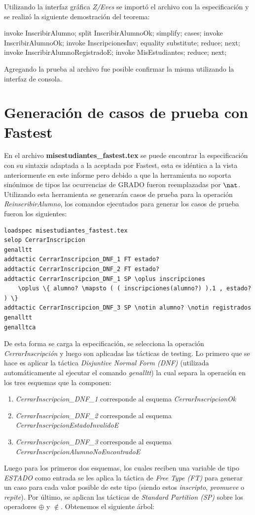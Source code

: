\documentclass{article}
\begin{document}
Utilizando la interfaz gráfica \emph{Z/Eves} se importó el archivo con la especificación y se realizó la siguiente demostración del teorema:
\begin{zproof}[InscribirAlumnoPI]
  invoke InscribirAlumno;
  split InscribirAlumnoOk;
  simplify;
  cases;
  invoke InscribirAlumnoOk;
  invoke InscripcionesInv;
  equality substitute;
  reduce;
  next;
  invoke InscribirAlumnoRegistradoE;
  invoke \Xi MisEstudiantes;
  reduce;
  next;
\end{zproof}

Agregando la prueba al archivo fue posible confirmar la misma utilizando la interfaz de consola.

\section{Generación de casos de prueba con Fastest}
En el archivo \textbf{misestudiantes\_fastest.tex} se puede encontrar la especificación con su sintaxis adaptada a la aceptada por Fastest, esta es idéntica a la vista anteriormente en este informe pero debido a que la herramienta no soporta sinónimos de tipos las ocurrencias de GRADO fueron reemplazadas por $\nat$.
Utilizando esta herramienta se generarán casos de prueba para la operación \emph{ReinscribirAlumno}, los comandos ejecutados para generar los casos de prueba fueron los siguientes:

\begin{verbatim}
loadspec misestudiantes_fastest.tex
selop CerrarInscripcion
genalltt
addtactic CerrarInscripcion_DNF_1 FT estado?
addtactic CerrarInscripcion_DNF_2 FT estado?
addtactic CerrarInscripcion_DNF_1 SP \oplus inscripciones 
    \oplus \{ alumno? \mapsto ( ( inscripciones(alumno?) ).1 , estado? ) \}
addtactic CerrarInscripcion_DNF_3 SP \notin alumno? \notin registrados
genalltt
genalltca
\end{verbatim}

De esta forma se carga la especificación, se selecciona la operación \emph{CerrarInscripción} y luego son aplicadas las tácticas de testing.
Lo primero que se hace es aplicar la táctica \emph{Disjuntive Normal Form (DNF)} (utilizada automáticamente al ejecutar el comando \emph{genalltt}) la cual separa la operación en los tres esquemas que la componen:
\begin{enumerate}
 \item \emph{CerrarInscripcion\_DNF\_1} corresponde al esquema \emph{CerrarInscripcionOk}
 \item \emph{CerrarInscripcion\_DNF\_2} corresponde al esquema \emph{CerrarInscripcionEstadoInvalidoE}
 \item \emph{CerrarInscripcion\_DNF\_3} corresponde al esquema \emph{CerrarInscripcionAlumnoNoEncontradoE}
\end{enumerate}
Luego para los primeros dos esquemas, los cuales reciben una variable de tipo \emph{ESTADO} como entrada se les aplica la táctica de \emph{Free Type (FT)} para generar un caso para cada valor posible de este tipo (siendo estos \emph{inscripto}, \emph{promueve} o \emph{repite}). Por último, se aplican las tácticas de \emph{Standard Partition (SP)} sobre los operadores $\oplus$ y $\notin$. Obtenemos el siguiente árbol:
\end{document}
